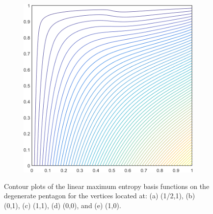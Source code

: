 \begin{figure}
\begin{subfigure}[b]{0.39\textwidth}
		\caption{}
	\end{subfigure}
	\hspace{1.5cm}
	\begin{subfigure}[b]{0.39\textwidth}
		\centering
		\includegraphics[width=\textwidth]{figures/sec_BF/deg_square_MAXENT1_contour_b2.png}
		\caption{}
	\end{subfigure}
\caption{Contour plots of the linear maximum entropy basis functions on the degenerate pentagon for the vertices located at: (a) (1/2,1), (b) (0,1), (c) (1,1), (d) (0,0), and (e) (1,0).}
\label{fig::2D_MAXENT1_deg_square_basis_functions}
\end{figure}


